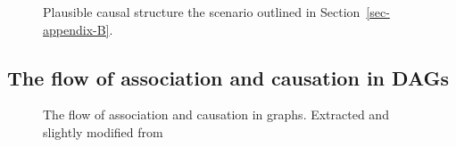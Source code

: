 \documentclass[
  authoryear,
  review,
  1p]{elsarticle}
\begin{document}
\begin{figure}

\begin{minipage}{0.50\linewidth}

\centering{

\[
\begin{aligned}
  X & := f_{X}(e_{X}) \\
  T & := f_{Z}(X,e_{T}) \\
  Y & := f_{Y}(T,X,e_{Y}) \\
  e_{T} & \perp\!\!\!\perp e_{X} \\
  e_{T} & \perp\!\!\!\perp e_{Y} \\
  e_{X} & \perp\!\!\!\perp e_{Y}
\end{aligned}
\]

}


\end{minipage}%
%
\begin{minipage}{0.50\linewidth}



\end{minipage}%
\newline
\begin{minipage}{0.50\linewidth}

\end{minipage}%

\caption{\label{fig-example}Plausible causal structure the scenario
outlined in Section~\ref{sec-appendix-B}.}

\end{figure}%

\subsection{The flow of association and causation in
DAGs}\label{sec-appendix-D}

\begin{figure}


\caption{\label{fig-ACflow}The flow of association and causation in
graphs. Extracted and slightly modified from \citet[pp.~31]{Neal_2020}}

\end{figure}%
\end{document}
